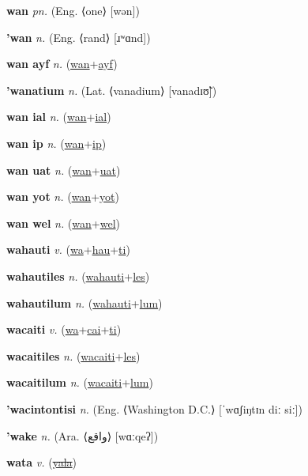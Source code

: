 \textbf{\hypertarget{wan}{wan}} \textit{pn.} (Eng. ⟨one⟩ [wən])


\textbf{\hypertarget{'wan}{'wan}} \textit{n.} (Eng. ⟨rand⟩ [ɹʷɑnd])


\textbf{\hypertarget{wan ayf}{wan ayf}} \textit{n.} (\hyperlink{wan}{wan}+\allowbreak \hyperlink{ayf}{ayf})


\textbf{\hypertarget{'wanatium}{'wanatium}} \textit{n.} (Lat. ⟨vanadium⟩ [vanadɪʊ̃])


\textbf{\hypertarget{wan ial}{wan ial}} \textit{n.} (\hyperlink{wan}{wan}+\allowbreak \hyperlink{ial}{ial})


\textbf{\hypertarget{wan ip}{wan ip}} \textit{n.} (\hyperlink{wan}{wan}+\allowbreak \hyperlink{ip}{ip})


\textbf{\hypertarget{wan uat}{wan uat}} \textit{n.} (\hyperlink{wan}{wan}+\allowbreak \hyperlink{uat}{uat})


\textbf{\hypertarget{wan yot}{wan yot}} \textit{n.} (\hyperlink{wan}{wan}+\allowbreak \hyperlink{yot}{yot})


\textbf{\hypertarget{wan wel}{wan wel}} \textit{n.} (\hyperlink{wan}{wan}+\allowbreak \hyperlink{wel}{wel})


\textbf{\hypertarget{wahauti}{wahauti}} \textit{v.} (\hyperlink{wa}{wa}+\allowbreak \hyperlink{hau}{hau}+\allowbreak \hyperlink{ti}{ti})


\textbf{\hypertarget{wahautiles}{wahautiles}} \textit{n.} (\hyperlink{wahauti}{wahauti}+\allowbreak \hyperlink{les}{les})


\textbf{\hypertarget{wahautilum}{wahautilum}} \textit{n.} (\hyperlink{wahauti}{wahauti}+\allowbreak \hyperlink{lum}{lum})


\textbf{\hypertarget{wacaiti}{wacaiti}} \textit{v.} (\hyperlink{wa}{wa}+\allowbreak \hyperlink{cai}{cai}+\allowbreak \hyperlink{ti}{ti})


\textbf{\hypertarget{wacaitiles}{wacaitiles}} \textit{n.} (\hyperlink{wacaiti}{wacaiti}+\allowbreak \hyperlink{les}{les})


\textbf{\hypertarget{wacaitilum}{wacaitilum}} \textit{n.} (\hyperlink{wacaiti}{wacaiti}+\allowbreak \hyperlink{lum}{lum})


\textbf{\hypertarget{'wacintontisi}{'wacintontisi}} \textit{n.} (Eng. ⟨Washington D.C.⟩ [ˈwɑʃiŋtɪn diː siː])


\textbf{\hypertarget{'wake}{'wake}} \textit{n.} (Ara. ⟨{\arabics{}واقع‎}⟩ [wɑːqeʔ])


\textbf{\hypertarget{wata}{wata}} \textit{v.} (\hyperlink{yala}{\sout{yala}})


